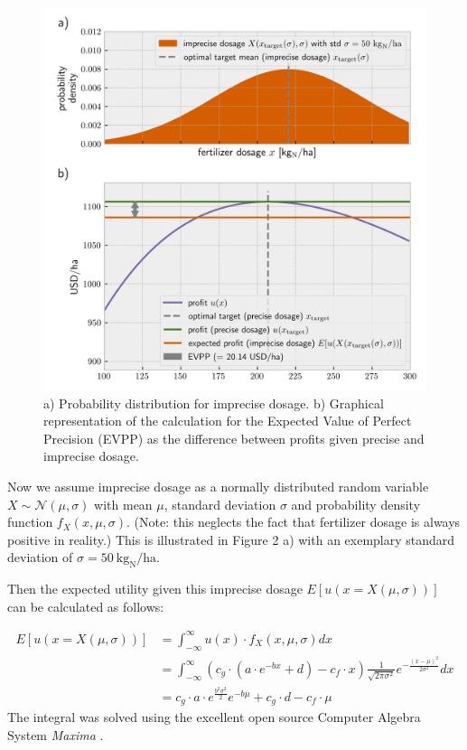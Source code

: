 \begin{figure}
\centering
\includegraphics{imgs/synplot2.png}
\caption{a) Probability distribution for imprecise dosage. b) Graphical representation of the calculation for the Expected Value of Perfect Precision (EVPP) as the difference between profits given precise and imprecise dosage.}
\end{figure}

Now we assume imprecise dosage as a normally distributed random variable $X \sim \mathcal{N}(\mu, \sigma)$ with mean $\mu$, standard deviation $\sigma$ and probability density function $f_X(x, \mu, \sigma)$. (Note: this neglects the fact that fertilizer dosage is always positive in reality.) This is illustrated in Figure 2 a) with an exemplary standard deviation of $\sigma = 50 \ \text{kg}_\text{N} / \text{ha}$.

Then the expected utility given this imprecise dosage $E[u(x=X(\mu, \sigma))]$ can be calculated as follows:

\begin{align}
    E[u(x=X(\mu, \sigma))] &= \int_{-\infty}^\infty u(x)\cdot f_X(x, \mu, \sigma) dx \\
    &= \int_{-\infty}^\infty (c_g \cdot (a \cdot e^{-bx} +d) - c_f \cdot x) \frac{1}{\sqrt{2\pi\sigma^2} } e^{-\frac{(x-\mu)^2}{2\sigma^2}} dx\\
    &= c_g \cdot a \cdot e^{\frac{b^2 \sigma^2}{2}} e^{-b \mu} + c_g \cdot d - c_f \cdot \mu
\end{align} The integral was solved using the excellent open source Computer Algebra System \emph{Maxima} \citep{maxima}.

